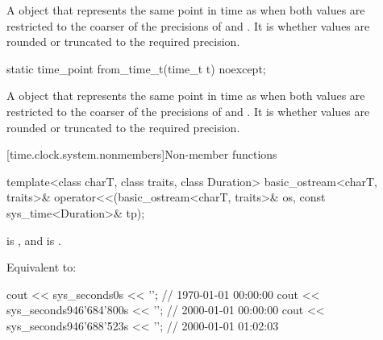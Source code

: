 \begin{itemdescr}
\pnum
\returns
A  object that represents the same point in time as 
when both values are restricted to the coarser of the precisions of  and
.
It is 
whether values are rounded or truncated to the required precision.
\end{itemdescr}

%
\begin{itemdecl}
static time_point from_time_t(time_t t) noexcept;
\end{itemdecl}

\begin{itemdescr}
\pnum
\returns
A  object that represents the same point in time as 
when both values are restricted to the coarser of the precisions of  and
.
It is 
whether values are rounded or truncated to the required precision.
\end{itemdescr}

[time.clock.system.nonmembers]{Non-member functions}

%
\begin{itemdecl}
template<class charT, class traits, class Duration>
  basic_ostream<charT, traits>&
    operator<<(basic_ostream<charT, traits>& os, const sys_time<Duration>& tp);
\end{itemdecl}

\begin{itemdescr}
\pnum
\constraints
{} is , and
 is .

\pnum
\effects
Equivalent to:

\pnum
\begin{example}
\begin{codeblock}
cout << sys_seconds{0s} << '\n';                // 1970-01-01 00:00:00
cout << sys_seconds{946'684'800s} << '\n';      // 2000-01-01 00:00:00
cout << sys_seconds{946'688'523s} << '\n';      // 2000-01-01 01:02:03
\end{codeblock}
\end{example}
\end{itemdescr}

